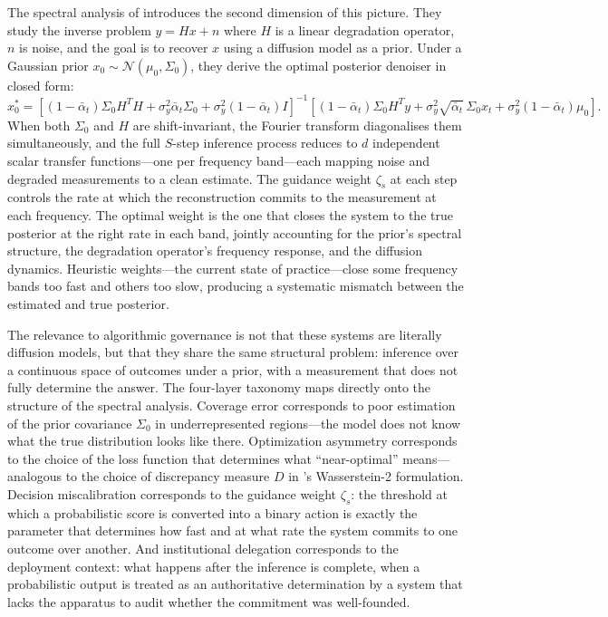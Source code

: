 \documentclass[12pt, a4paper]{article}
\begin{document}
The spectral analysis of \citet{benita2026} introduces the second dimension of this picture. They study the inverse problem $y = Hx + n$ where $H$ is a linear degradation operator, $n$ is noise, and the goal is to recover $x$ using a diffusion model as a prior. Under a Gaussian prior $x_0 \sim \mathcal{N}(\mu_0, \Sigma_0)$, they derive the optimal posterior denoiser in closed form:
\[
x_0^* = \left[(1-\bar\alpha_t)\Sigma_0 H^T H + \sigma_y^2 \bar\alpha_t \Sigma_0 + \sigma_y^2(1-\bar\alpha_t)I\right]^{-1}
\!\left[(1-\bar\alpha_t)\Sigma_0 H^T y + \sigma_y^2\sqrt{\bar\alpha_t}\,\Sigma_0 x_t + \sigma_y^2(1-\bar\alpha_t)\mu_0\right].
\]
When both $\Sigma_0$ and $H$ are shift-invariant, the Fourier transform diagonalises them simultaneously, and the full $S$-step inference process reduces to $d$ independent scalar transfer functions---one per frequency band---each mapping noise and degraded measurements to a clean estimate. The guidance weight $\zeta_s$ at each step controls the rate at which the reconstruction commits to the measurement at each frequency. The optimal weight is the one that closes the system to the true posterior at the right rate in each band, jointly accounting for the prior's spectral structure, the degradation operator's frequency response, and the diffusion dynamics. Heuristic weights---the current state of practice---close some frequency bands too fast and others too slow, producing a systematic mismatch between the estimated and true posterior.

The relevance to algorithmic governance is not that these systems are literally diffusion models, but that they share the same structural problem: inference over a continuous space of outcomes under a prior, with a measurement that does not fully determine the answer. The four-layer taxonomy maps directly onto the structure of the spectral analysis. Coverage error corresponds to poor estimation of the prior covariance $\Sigma_0$ in underrepresented regions---the model does not know what the true distribution looks like there. Optimization asymmetry corresponds to the choice of the loss function that determines what \enquote{near-optimal} means---analogous to the choice of discrepancy measure $D$ in \citet{benita2026}'s Wasserstein-2 formulation. Decision miscalibration corresponds to the guidance weight $\zeta_s$: the threshold at which a probabilistic score is converted into a binary action is exactly the parameter that determines how fast and at what rate the system commits to one outcome over another. And institutional delegation corresponds to the deployment context: what happens after the inference is complete, when a probabilistic output is treated as an authoritative determination by a system that lacks the apparatus to audit whether the commitment was well-founded.
\end{document}
